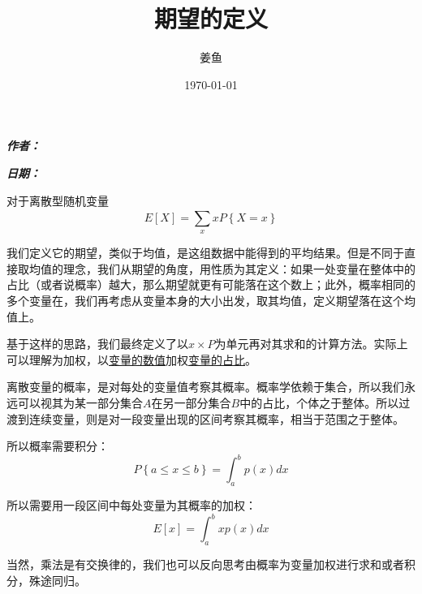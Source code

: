 \documentclass[fontset=none]{ctexart}
\makeatletter
\renewcommand{\maketitle}{
  \begin{flushleft} %
    {\huge\bfseries \@title \par} %
    \vspace{0.5em}
    {\large \bfseries \textit{作者：} \@author \par} %
    \vspace{0.5em}
    {\large\bfseries \textit{日期：}\@date} %
  \end{flushleft}
  \thispagestyle{empty} %
  \vspace{1cm} %
}
\makeatother
\begin{document}
\title{期望的定义}
\author{姜鱼}
\date{\today}
\maketitle
\songti

对于离散型随机变量$$E\left[ X \right] =\sum_x^{}{xP\left\{ X=x \right\}}$$

我们定义它的期望，类似于均值，是这组数据中能得到的平均结果。但是不同于直接取均值的理念，我们从期望的角度，用性质为其定义：如果一处变量在整体中的占比（或者说概率）越大，那么期望就更有可能落在这个数上；此外，概率相同的多个变量在，我们再考虑从变量本身的大小出发，取其均值，定义期望落在这个均值上。

基于这样的思路，我们最终定义了以$x × P$为单元再对其求和的计算方法。实际上可以理解为加权，以\underline{变量的数值}加权\underline{变量的占比}。

离散变量的概率，是对每处的变量值考察其概率。概率学依赖于集合，所以我们永远可以视其为某一部分集合$A$在另一部分集合$B$中的占比，个体之于整体。所以过渡到连续变量，则是对一段变量出现的区间考察其概率，相当于范围之于整体。

所以概率需要积分：$$P\left\{ a\leqslant x\leqslant b \right\} =\int_a^b{p\left( x \right) dx}$$

所以需要用一段区间中每处变量为其概率的加权：$$E\left[ x \right] =\int_a^b{xp\left( x \right) dx}$$

当然，乘法是有交换律的，我们也可以反向思考由概率为变量加权进行求和或者积分，殊途同归。
\end{document}
